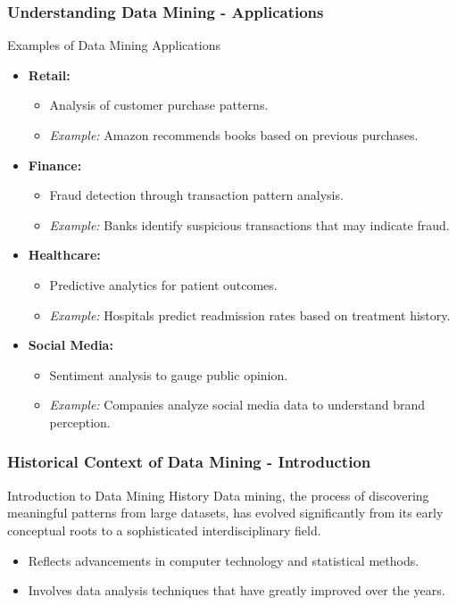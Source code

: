 \documentclass[aspectratio=169]{beamer}
\begin{document}
\begin{frame}[fragile]
    \frametitle{Understanding Data Mining - Applications}
    \begin{block}{Examples of Data Mining Applications}
        \begin{itemize}
            \item \textbf{Retail:} 
                \begin{itemize}
                    \item Analysis of customer purchase patterns.
                    \item \textit{Example:} Amazon recommends books based on previous purchases.
                \end{itemize}
            \item \textbf{Finance:} 
                \begin{itemize}
                    \item Fraud detection through transaction pattern analysis.
                    \item \textit{Example:} Banks identify suspicious transactions that may indicate fraud.
                \end{itemize}
            \item \textbf{Healthcare:} 
                \begin{itemize}
                    \item Predictive analytics for patient outcomes.
                    \item \textit{Example:} Hospitals predict readmission rates based on treatment history.
                \end{itemize}
            \item \textbf{Social Media:} 
                \begin{itemize}
                    \item Sentiment analysis to gauge public opinion.
                    \item \textit{Example:} Companies analyze social media data to understand brand perception.
                \end{itemize}
        \end{itemize}
    \end{block}
\end{frame}

\begin{frame}[fragile]
    \frametitle{Historical Context of Data Mining - Introduction}
    \begin{block}{Introduction to Data Mining History}
        Data mining, the process of discovering meaningful patterns from large datasets, has evolved significantly from its early conceptual roots to a sophisticated interdisciplinary field.
    \end{block}
    \begin{itemize}
        \item Reflects advancements in computer technology and statistical methods.
        \item Involves data analysis techniques that have greatly improved over the years.
    \end{itemize}
\end{frame}
\end{document}
